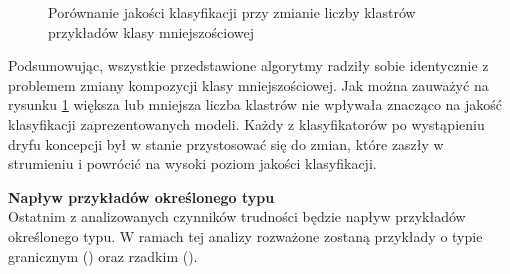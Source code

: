 \begin{figure}[h]
    \centering
    \qquad
    \qquad
    \caption{Porównanie jakości klasyfikacji przy zmianie liczby klastrów przykładów klasy mniejszościowej}\label{Figure:ChangeComposition}
\end{figure}

\noindent Podsumowując, wszystkie przedstawione algorytmy radziły sobie identycznie z problemem zmiany kompozycji klasy mniejszościowej. Jak można zauważyć na rysunku \ref{Figure:ChangeComposition} większa lub mniejsza liczba klastrów nie wpływała znacząco na jakość klasyfikacji zaprezentowanych modeli. Każdy z klasyfikatorów po wystąpieniu dryfu koncepcji był w stanie przystosować się do zmian, które zaszły w strumieniu i powrócić na wysoki poziom jakości klasyfikacji.

\newpage

\noindent \textbf{Napływ przykładów określonego typu}\\

\noindent Ostatnim z analizowanych czynników trudności będzie napływ przykładów określonego typu. W ramach tej analizy rozważone zostaną przykłady o typie granicznym () oraz rzadkim ().

